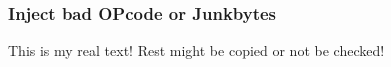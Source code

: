\subsubsection{Inject bad OPcode or Junkbytes} \label{subsubsection:counter-reengineering-break-inject}
This is my real text! Rest might be copied or not be checked!

